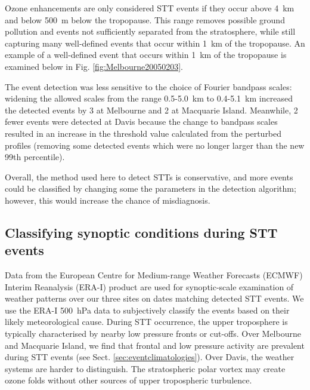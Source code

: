 \documentclass[acp, manuscript]{copernicus} %
\providecommand{\DIFadd}[1]{{\protect\color{blue}\uwave{#1}}} %
\providecommand{\DIFaddbegin}{} %
\providecommand{\DIFaddend}{} %
\begin{document}
    Ozone enhancements are only considered STT events if they occur above 4~km and below 500~m below the tropopause.
    This range removes possible ground pollution and events not sufficiently separated from the stratosphere, while still capturing many well-defined events that occur within 1~km of the tropopause.
    An example of a well-defined event that occurs within 1~km of the tropopause is examined below in Fig. \ref{fig:Melbourne20050203}.

    The event detection was less sensitive to the choice of Fourier bandpass scales: widening the allowed scales from the range 0.5-5.0~km to 0.4-5.1~km increased the detected events by 3 at Melbourne and 2 at Macquarie Island. Meanwhile, 2 fewer events were detected at Davis because the change to bandpass scales resulted in an increase in the threshold value calculated from the perturbed profiles (removing some detected events which were no longer larger than the new 99th percentile).

    Overall, the method used here to detect STTs is conservative, and more events could be classified by changing some the parameters in the detection algorithm; however, this would increase the chance of misdiagnosis. 

  \subsection{Classifying synoptic conditions during STT events}
  \label{Section:WeatherClassifications}
    Data from the European Centre for Medium-range Weather Forecasts (ECMWF) Interim Reanalysis (ERA-I) \citep{Dee2011} product are used for synoptic-scale examination of weather patterns over our three sites on dates matching detected STT events.
    We use the ERA-I 500~hPa data to subjectively classify the events based on their likely meteorological cause\DIFaddbegin \DIFadd{, examining each date where an event was detected}\DIFaddend .
    During STT occurrence, the upper troposphere is typically characterised by nearby low pressure fronts or cut-offs.
    Over Melbourne and Macquarie Island, we find that frontal and low pressure activity are prevalent during STT events (see Sect. \ref{sec:eventclimatologies}).
    Over Davis, the weather systems are harder to distinguish. The stratospheric polar vortex may create ozone folds without other sources of upper tropospheric turbulence.
\end{document}
